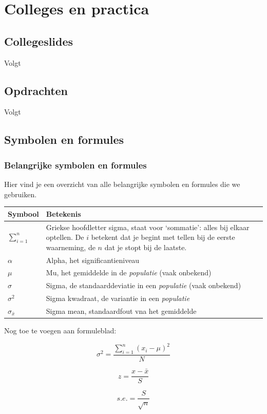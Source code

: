 \documentclass[
  letterpaper,
  DIV=11,
  numbers=noendperiod]{scrreprt}
\newcounter{none} %
\begin{document}
\part{Colleges en practica}

\chapter{Collegeslides}\label{sec-colleges}

Volgt

\chapter{Opdrachten}\label{opdrachten}

Volgt

\cleardoublepage
{}
{}
\appendix

\chapter{Symbolen en formules}\label{symbolen-en-formules}

\section{Belangrijke symbolen en
formules}\label{belangrijke-symbolen-en-formules}

Hier vind je een overzicht van alle belangrijke symbolen en formules die
we gebruiken.

{\def\LTcaptype{none} %
\begin{longtable}[]{@{}
  >{\raggedright\arraybackslash}p{}
  >{\raggedright\arraybackslash}p{}@{}}
\toprule\noalign{}
\begin{minipage}[b]{\linewidth}\raggedright
Symbool
\end{minipage} & \begin{minipage}[b]{\linewidth}\raggedright
Betekenis
\end{minipage} \\
\midrule\noalign{}
\endhead
\bottomrule\noalign{}
\endlastfoot
\(\sum_{i=1}^n\) & Griekse hoofdletter sigma, staat voor `sommatie':
alles bij elkaar optellen. De \(i\) betekent dat je begint met tellen
bij de eerste waarneming, de \(n\) dat je stopt bij de laatste. \\
\(\alpha\) & Alpha, het significantieniveau \\
\(\mu\) & Mu, het gemiddelde in de \emph{populatie} (vaak onbekend) \\
\(\sigma\) & Sigma, de standaarddeviatie in een \emph{populatie} (vaak
onbekend) \\
\(\sigma^2\) & Sigma kwadraat, de variantie in een \emph{populatie} \\
\(\sigma_{\bar{x}}\) & Sigma mean, standaardfout vna het gemiddelde \\
\end{longtable}
}

Nog toe te voegen aan formuleblad:

\[ \sigma^2=\frac{\sum_{i=1}^{n}(x_i-\mu)^2}{N} \]

\[ z=\frac{x-\bar{x}}{S} \]

\[ s.e. =\frac{S}{\sqrt{n}} \]
\end{document}
